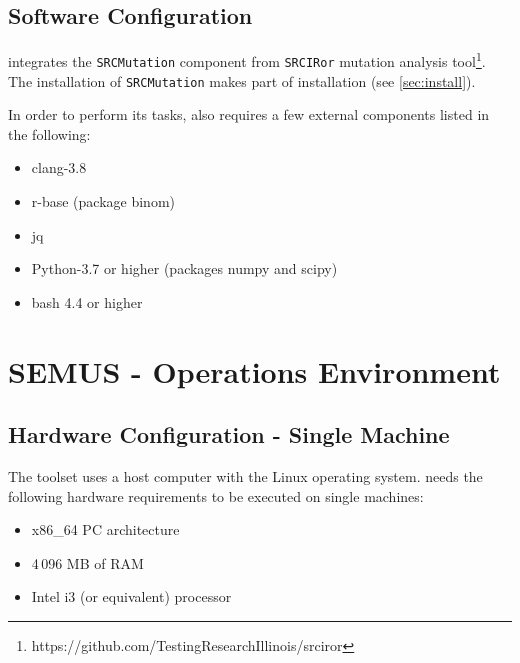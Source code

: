 \section{Software Configuration}

\MASS integrates the \texttt{SRCMutation} component from \texttt{SRCIRor} mutation analysis tool\footnote{https://github.com/TestingResearchIllinois/srciror}. The installation of \texttt{SRCMutation} makes part of \MASS installation (see \ref{sec:install}).

In order to perform its tasks, \MASS also requires a few external components listed in the following:

\begin{itemize}
	\item clang-3.8
	\item r-base (package binom)
	\item jq
	\item Python-3.7 or higher (packages numpy and scipy)
	\item bash 4.4 or higher
\end{itemize}



\chapter{SEMUS - Operations Environment}
\label{chapter:semus:operationsEnv}

\section{Hardware Configuration - Single Machine}
\label{sec:semus:config:hw}

The \SEMUS toolset uses a host computer with the Linux operating system. \SEMUS needs the following hardware requirements to be executed on single machines:

\begin{itemize}
	\item x86\_64 PC architecture
	\item 4\,096 MB of RAM
	\item Intel i3 (or equivalent) processor
\end{itemize}


